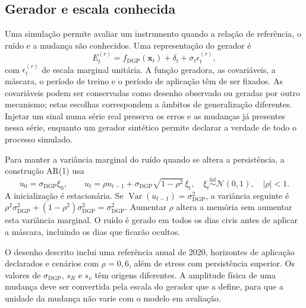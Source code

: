 \subsection{Gerador e escala conhecida}
\label{sec:mat-gerador}
Uma simulação permite avaliar um instrumento quando a relação de referência, o ruído e a mudança são conhecidos. Uma representação do gerador é
\begin{equation}
E_t^{(r)}=f_{\mathrm{DGP}}(\boldsymbol x_t)+\delta_t+\sigma_t\epsilon_t^{(r)},
\label{eq:mat-dgp}
\end{equation}
com $\epsilon_t^{(r)}$ de escala marginal unitária. A função geradora, as covariáveis, a máscara, o período de treino e o período de aplicação têm de ser fixados. As covariáveis podem ser conservadas como desenho observado ou geradas por outro mecanismo; estas escolhas correspondem a âmbitos de generalização diferentes. Injetar um sinal numa série real preserva os erros e as mudanças já presentes nessa série, enquanto um gerador sintético permite declarar a verdade de todo o processo simulado.

Para manter a variância marginal do ruído quando se altera a persistência, a construção AR(1) usa
\begin{equation}
u_0=\sigma_{\mathrm{DGP}}\xi_0,
\qquad u_t=\rho u_{t-1}+\sigma_{\mathrm{DGP}}\sqrt{1-\rho^2}\,\xi_t,
\quad \xi_t\overset{\mathrm{iid}}{\sim}\mathcal N(0,1),\quad |\rho|<1.
\label{eq:mat-ar-gerador}
\end{equation}
A inicialização é estacionária. Se $\operatorname{Var}(u_{t-1})=\sigma_{\mathrm{DGP}}^2$, a variância seguinte é $\rho^2\sigma_{\mathrm{DGP}}^2+(1-\rho^2)\sigma_{\mathrm{DGP}}^2=\sigma_{\mathrm{DGP}}^2$. Aumentar $\rho$ altera a memória sem aumentar esta variância marginal. O ruído é gerado em todos os dias civis antes de aplicar a máscara, incluindo os dias que ficarão ocultos.

O desenho descrito inclui uma referência anual de 2020, horizontes de aplicação declarados e cenários com $\rho=0{,}6$, além de stress com persistência superior. Os valores de $\sigma_{\mathrm{DGP}}$, $s_R$ e $s_\nu$ têm origens diferentes. A amplitude física de uma mudança deve ser convertida pela escala do gerador que a define, para que a unidade da mudança não varie com o modelo em avaliação.

